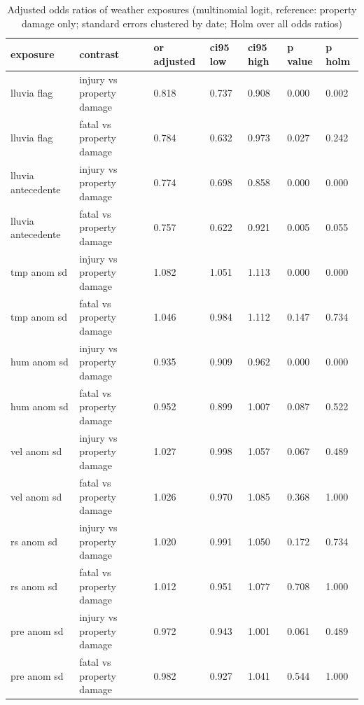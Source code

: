 \begin{table}[htbp]
\centering
\caption{Adjusted odds ratios of weather exposures (multinomial logit, reference: property damage only; standard errors clustered by date; Holm over all odds ratios)}
\label{tab:table5_associative_odds_ratios}
\begin{tabular}{lllllll}
\toprule
\textbf{exposure} & \textbf{contrast} & \textbf{or adjusted} & \textbf{ci95 low} & \textbf{ci95 high} & \textbf{p value} & \textbf{p holm} \\
\midrule
lluvia flag & injury vs property damage & 0.818 & 0.737 & 0.908 & 0.000 & 0.002 \\
lluvia flag & fatal vs property damage & 0.784 & 0.632 & 0.973 & 0.027 & 0.242 \\
lluvia antecedente & injury vs property damage & 0.774 & 0.698 & 0.858 & 0.000 & 0.000 \\
lluvia antecedente & fatal vs property damage & 0.757 & 0.622 & 0.921 & 0.005 & 0.055 \\
tmp anom sd & injury vs property damage & 1.082 & 1.051 & 1.113 & 0.000 & 0.000 \\
tmp anom sd & fatal vs property damage & 1.046 & 0.984 & 1.112 & 0.147 & 0.734 \\
hum anom sd & injury vs property damage & 0.935 & 0.909 & 0.962 & 0.000 & 0.000 \\
hum anom sd & fatal vs property damage & 0.952 & 0.899 & 1.007 & 0.087 & 0.522 \\
vel anom sd & injury vs property damage & 1.027 & 0.998 & 1.057 & 0.067 & 0.489 \\
vel anom sd & fatal vs property damage & 1.026 & 0.970 & 1.085 & 0.368 & 1.000 \\
rs anom sd & injury vs property damage & 1.020 & 0.991 & 1.050 & 0.172 & 0.734 \\
rs anom sd & fatal vs property damage & 1.012 & 0.951 & 1.077 & 0.708 & 1.000 \\
pre anom sd & injury vs property damage & 0.972 & 0.943 & 1.001 & 0.061 & 0.489 \\
pre anom sd & fatal vs property damage & 0.982 & 0.927 & 1.041 & 0.544 & 1.000 \\
\bottomrule
\end{tabular}
\end{table}
